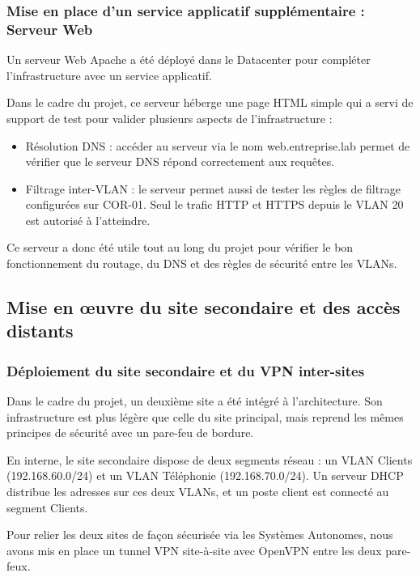 \subsubsection{Mise en place d'un service applicatif supplémentaire : Serveur Web}

Un serveur Web Apache a été déployé dans le Datacenter pour compléter l'infrastructure avec un service applicatif.

Dans le cadre du projet, ce serveur héberge une page HTML simple qui a servi de support de test pour valider plusieurs aspects de l'infrastructure :

\begin{itemize}
    \item Résolution DNS : accéder au serveur via le nom web.entreprise.lab permet de vérifier que le serveur DNS répond correctement aux requêtes.

    \item Filtrage inter-VLAN : le serveur permet aussi de tester les règles de filtrage configurées sur COR-01. Seul le trafic HTTP et HTTPS depuis le VLAN 20 est autorisé à l'atteindre.
\end{itemize}

Ce serveur a donc été utile tout au long du projet pour vérifier le bon fonctionnement du routage, du DNS et des règles de sécurité entre les VLANs.

\newpage
\subsection{Mise en œuvre du site secondaire et des accès distants}

\subsubsection{Déploiement du site secondaire et du VPN inter-sites}

Dans le cadre du projet, un deuxième site a été intégré à l'architecture. Son infrastructure est plus légère que celle du site principal, mais reprend les mêmes principes de sécurité avec un pare-feu de bordure.

En interne, le site secondaire dispose de deux segments réseau : un VLAN Clients (192.168.60.0/24) et un VLAN Téléphonie (192.168.70.0/24). Un serveur DHCP distribue les adresses sur ces deux VLANs, et un poste client est connecté au segment Clients.

Pour relier les deux sites de façon sécurisée via les Systèmes Autonomes, nous avons mis en place un tunnel VPN site-à-site avec OpenVPN entre les deux pare-feux.

